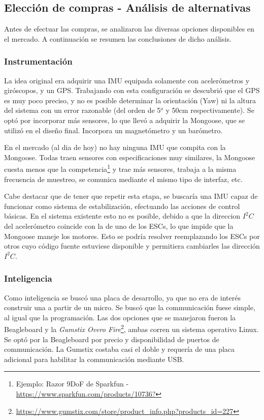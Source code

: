 \documentclass[main]{subfiles}
\begin{document}
\subsection{Elección de compras - Análisis de alternativas}
\label{sec:anexo_costos-analisis-de-alternativas}

Antes de efectuar las compras, se analizaron las diversas opciones disponibles en el mercado. A continuación se resumen las conclusiones de dicho análisis.

\subsubsection{Instrumentación}
\label{sec:costos-instrumentacion}

La idea original era adquirir una IMU equipada solamente con acelerómetros y giróscopos, y un GPS. Trabajando con esta configuración se descubrió que el GPS es muy poco preciso, y no es posible determinar la orientación (Yaw) ni la altura del sistema con un error razonable (del orden de 5$^o$ y 50cm respectivamente). Se optó por incorporar más sensores, lo que llevó a adquirir la Mongoose, que se utilizó en el diseño final. Incorpora un magnetómetro y un barómetro.

En el mercado (al dia de hoy) no hay ninguna IMU que compita con la Mongoose. Todas traen sensores con especificaciones muy similares, la Mongoose cuesta menos que la competencia\footnote{Ejemplo: Razor 9DoF de Sparkfun - \url{https://www.sparkfun.com/products/10736?}} y trae más sensores, trabaja a la misma frecuencia de muestreo, se comunica mediante el mismo tipo de interfaz, etc.

Cabe destacar que de tener que repetir esta etapa, se buscaría una IMU capaz de funcionar como sistema de estabilización, efectuando las acciones de control básicas. En el sistema existente esto no es posible, debido a que la direccion $I^2C$ del acelerómetro coincide con la de uno de los ESCs, lo que impide que la Mongoose maneje los motores. Esto se podría resolver reemplazando los ESCs por otros cuyo código fuente estuviese disponible y permitiera cambiarles las dirección $I^2C$.

\subsubsection{Inteligencia}
\label{sec:anexo_costos-inteligencia}

Como inteligencia se buscó una placa de desarrollo, ya que no era de interés construir una a partir de un micro. Se buscó que la communicación fuese simple, al igual que la programación. Las dos opciones que se manejaron fueron la Beagleboard y la \textit{Gumstix Overo Fire}\footnote{\url{https://www.gumstix.com/store/product_info.php?products_id=227}}, ambas corren un sistema operativo Linux. Se optó por la Beagleboard por precio y disponibilidad de puertos de communicación. La Gumstix costaba casi el doble y requería de una placa adicional para habilitar la communicación mediante USB.
\end{document}
